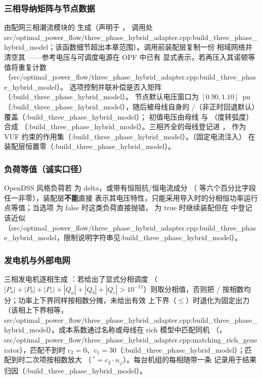 \subsubsection*{三相导纳矩阵与节点数据}
 由配网三相潮流模块的 
生成（声明于 ，
调用处 src/optimal\_power\_flow/three\_phase\_hybrid\_adapter.cpp:build\_three\_phase\_hybrid\_model；该函数细节超出本章范围）。调用前装配层复制一份
相域网络并清空其 ——参考电压与可调度电源在 OPF 中已有
显式表示，若再压入其诺顿等值将重复计数（src/optimal\_power\_flow/three\_phase\_hybrid\_adapter.cpp:build\_three\_phase\_hybrid\_model）。
 选项控制并联补偿是否入矩阵（:build\_three\_phase\_hybrid\_model）。
节点默认电压窗口为 $[0.90,1.10]$~pu（:build\_three\_phase\_hybrid\_model），随后被母线自身的
/（非正时回退默认）覆盖（:build\_three\_phase\_hybrid\_model）；
初值电压由母线  与 （度转弧度）合成
（:build\_three\_phase\_hybrid\_model）。三相齐全的母线登记进 ，
作为 VUF 约束的作用集（:build\_three\_phase\_hybrid\_model）。（固定电流注入）
在装配层恒置零（:build\_three\_phase\_hybrid\_model）。

\subsubsection*{负荷等值（诚实口径）}
OpenDSS 风格负荷若  为 delta，或带有恒阻抗/恒电流成分
（ 等六个百分比字段任一非零），装配层\textbf{不能}直接
表示其电压特性，只能采用导入时的分相恒功率运行点等值；当选项
 为 false 时这类负荷直接抛错，
为 true 时继续装配但在  中登记该近似
（src/optimal\_power\_flow/three\_phase\_hybrid\_adapter.cpp:build\_three\_phase\_hybrid\_model，限制说明字符串见:build\_three\_phase\_hybrid\_model）。

\subsubsection*{发电机与外部电网}
三相发电机逐相生成 ：若给出了显式分相调度
（$|P_a|+|P_b|+|P_c|+|Q_a|+|Q_b|+|Q_c|>10^{-12}$）则取分相值，否则把
/ 按相数均分；功率上下界同样按相数分摊，未给出有效
上下界（$\le$）时退化为固定出力（该相上下界相等，
src/optimal\_power\_flow/three\_phase\_hybrid\_adapter.cpp:build\_three\_phase\_hybrid\_model）。成本系数通过名称或母线在 rich 模型中匹配同机
（，src/optimal\_power\_flow/three\_phase\_hybrid\_adapter.cpp:matching\_rich\_generator），匹配不到时
$c_2=0$、$c_1=30$（:build\_three\_phase\_hybrid\_model）；匹配到时二次项按相数放大
（$\,{}^*=c_2\cdot n_\varphi$）。每台机组的每相随带一条
 记录用于结果归因（:build\_three\_phase\_hybrid\_model）。

